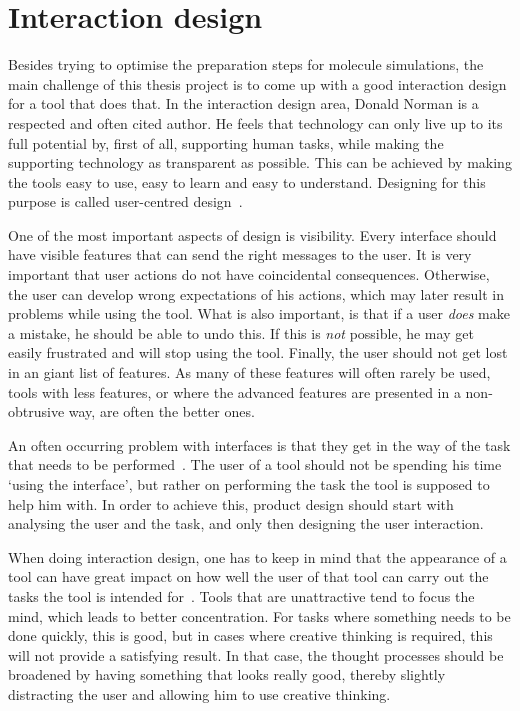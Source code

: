 \section{Interaction design}
Besides trying to optimise the preparation steps for molecule simulations, the main challenge of this thesis project is to come up with a good interaction design for a tool that does that. In the interaction design area, Donald Norman is a respected and often cited author. He feels that technology can only live up to its full potential by, first of all, supporting human tasks, while making the supporting technology as transparent as possible. This can be achieved by making the tools easy to use, easy to learn and easy to understand. Designing for this purpose is called user-centred design~\cite{norman2002design}.

One of the most important aspects of design is visibility. Every interface should have visible features that can send the right messages to the user. It is very important that user actions do not have coincidental consequences. Otherwise, the user can develop wrong expectations of his actions, which may later result in problems while using the tool. What is also important, is that if a user \emph{does} make a mistake, he should be able to undo this. If this is \emph{not} possible, he may get easily frustrated and will stop using the tool. Finally, the user should not get lost in an giant list of features. As many of these features will often rarely be used, tools with less features, or where the advanced features are presented in a non-obtrusive way, are often the better ones.

An often occurring problem with interfaces is that they get in the way of the task that needs to be performed~\cite{norman1990interfaces}. The user of a tool should not be spending his time `using the interface', but rather on performing the task the tool is supposed to help him with. In order to achieve this, product design should start with analysing the user and the task, and only then designing the user interaction.

When doing interaction design, one has to keep in mind that the appearance of a tool can have great impact on how well the user of that tool can carry out the tasks the tool is intended for~\cite{norman2002emotion}. Tools that are unattractive tend to focus the mind, which leads to better concentration. For tasks where something needs to be done quickly, this is good, but in cases where creative thinking is required, this will not provide a satisfying result. In that case, the thought processes should be broadened by having something that looks really good, thereby slightly distracting the user and allowing him to use creative thinking.


